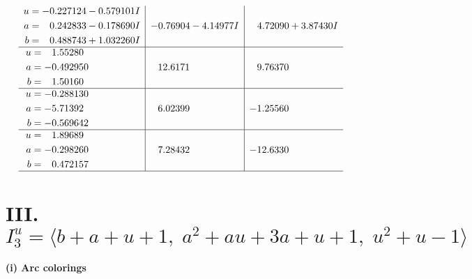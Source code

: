 \documentclass[1p]{elsarticle_modified}
\theoremstyle{definition}
\begin{document}
$$\begin{array}{c|c|c}
\begin{aligned}
u &= -0.227124 - 0.579101 I \\
a &= \phantom{-}0.242833 - 0.178690 I \\
b &= \phantom{-}0.488743 + 1.032260 I\end{aligned}
 & -0.76904 - 4.14977 I & \phantom{-}4.72090 + 3.87430 I \\ \hline\begin{aligned}
u &= \phantom{-}1.55280\phantom{ +0.000000I} \\
a &= -0.492950\phantom{ +0.000000I} \\
b &= \phantom{-}1.50160\phantom{ +0.000000I}\end{aligned}
 & \phantom{-}12.6171\phantom{ +0.000000I} & \phantom{-}9.76370\phantom{ +0.000000I} \\ \hline\begin{aligned}
u &= -0.288130\phantom{ +0.000000I} \\
a &= -5.71392\phantom{ +0.000000I} \\
b &= -0.569642\phantom{ +0.000000I}\end{aligned}
 & \phantom{-}6.02399\phantom{ +0.000000I} & -1.25560\phantom{ +0.000000I} \\ \hline\begin{aligned}
u &= \phantom{-}1.89689\phantom{ +0.000000I} \\
a &= -0.298260\phantom{ +0.000000I} \\
b &= \phantom{-}0.472157\phantom{ +0.000000I}\end{aligned}
 & \phantom{-}7.28432\phantom{ +0.000000I} & -12.6330\phantom{ +0.000000I}\\
 \hline 
 \end{array}$$\newpage\newpage\renewcommand{\arraystretch}{1}
\centering \section*{III. $I^u_{3}= \langle b+a+u+1,\;a^2+a u+3 a+u+1,\;u^2+u-1 \rangle$}
\flushleft \textbf{(i) Arc colorings}\\
\end{document}
